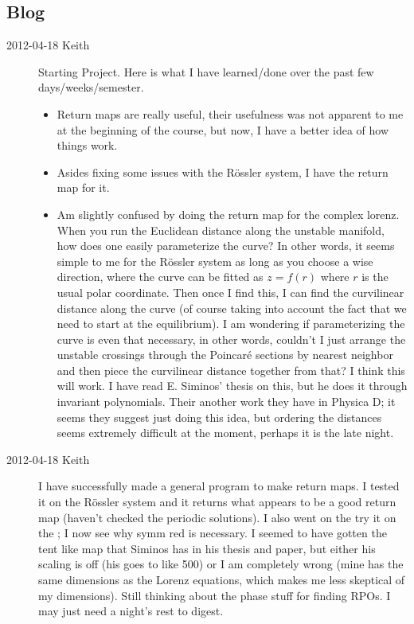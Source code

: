 
\subsection{Blog}
\begin{description}
\item[2012-04-18 Keith] Starting Project.  Here is what I have learned/done over the past few days/weeks/semester.
    \begin{itemize}
    \item Return maps are really useful, their usefulness was not apparent to me at the beginning of the course, but now, I have a better idea of how things work.
    \item Asides fixing some issues with the R\"ossler system, I have the return map for it.
    \item Am slightly confused by doing the return map for the complex lorenz.  When you run the Euclidean distance along the unstable manifold, how does one easily parameterize the curve?  In other words, it seems simple to me for the R\"ossler system as long as you choose a wise direction, where the curve can be fitted as $z = f(r)$ where $r$ is the usual polar coordinate.  Then once I find this, I can find the curvilinear distance along the curve (of course taking into account the fact that we need to start at the equilibrium). I am wondering if parameterizing the curve is even that necessary, in other words, couldn't I just arrange the unstable crossings through the Poincar\'e sections by nearest neighbor and then piece the curvilinear distance together from that?  I think this will work.  I have read E. Siminos' thesis on this, but he does it through invariant polynomials.  Their another work they have in Physica D; it seems they suggest just doing this idea, but ordering the distances seems extremely difficult at the moment, perhaps it is the late night.
        \end{itemize}

\item[2012-04-18 Keith] I have successfully made a general program to
make return maps.  I tested it on the R\"ossler system and it returns
what appears to be a good return map (haven't checked the periodic
solutions).  I also went on the try it on the \cLf; I now see
why symm red is necessary.  I seemed to have gotten the tent like map
that Siminos has in his thesis and paper, but either his scaling is off
(his goes to like 500) or I am completely wrong (mine has the same
dimensions as the Lorenz equations, which makes me less skeptical of my
dimensions).  Still thinking about the phase stuff for finding RPOs.  I
may just need a night's rest to digest.


\end{description}
